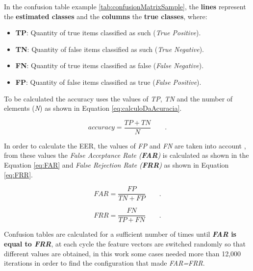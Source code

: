 		\par In the confusion table example \ref{tab:confusionMatrixSample}, the \textbf{lines} represent the \textbf{estimated classes} and the \textbf{columns} the \textbf{true classes}, where:

		\begin{itemize}
			\item \textbf{TP}: Quantity of true items classified as such (\textit{True Positive}).
			\item \textbf{TN}: Quantity of false items classified as such (\textit{True Negative}).
			\item \textbf{FN}: Quantity of true items classified as false (\textit{False Negative}).
			\item \textbf{FP}: Quantity of false items classified as true (\textit{False Positive}).
		\end{itemize}
		
		\clearpage
		

		\par To be calculated the accuracy uses the values of \textit{TP}, \textit{TN} and the number of elements (\textit{N}) as shown in Equation \ref{eq:calculoDaAcuracia}.
		
		\begin{equation}
			accuracy = \dfrac{TP + TN}{N} \qquad.
			\label{eq:calculoDaAcuracia}
		\end{equation}

		\par In order to calculate the EER, the values of \textit{FP} and \textit{FN}  are taken into account \cite{ghazali2018recent}, from these values the \textit{False Acceptance Rate (\textbf{FAR})} is calculated as shown in the Equation \ref{eq:FAR} and \textit{False Rejection Rate (\textbf{FRR})} as shown in Equation \ref{eq:FRR}.

		\begin{equation}
			FAR=\dfrac{FP}{TN+FP} \qquad.
			\label{eq:FAR}
		\end{equation}
		
		\begin{equation}
			FRR=\dfrac{FN}{TP+FN} \qquad.
			\label{eq:FRR}
		\end{equation}

		\par Confusion tables are calculated for a sufficient number of times until \textbf{\textit{FAR} is equal to \textit{FRR}}, at each cycle the feature vectors are switched randomly so that different values are obtained, in this work some cases needed more than 12,000 iterations in order to find the configuration that made \textit{FAR=FRR}.

